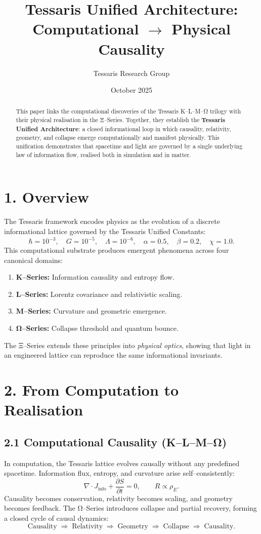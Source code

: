 \documentclass[11pt,a4paper]{article}
\title{\textbf{Tessaris Unified Architecture:\\Computational $\rightarrow$ Physical Causality}}
\author{Tessaris Research Group}
\date{October 2025}
\begin{document}
\maketitle

\begin{abstract}
This paper links the computational discoveries of the Tessaris K--L--M--Ω trilogy with their physical realisation in the Ξ--Series.  
Together, they establish the \textbf{Tessaris Unified Architecture}: a closed informational loop in which causality, relativity, geometry, and collapse emerge computationally and manifest physically.  
This unification demonstrates that spacetime and light are governed by a single underlying law of information flow, realised both in simulation and in matter.
\end{abstract}

\section{1. Overview}
The Tessaris framework encodes physics as the evolution of a discrete informational lattice governed by the Tessaris Unified Constants:
\[
\hbar = 10^{-3}, \quad G = 10^{-5}, \quad \Lambda = 10^{-6}, \quad \alpha = 0.5, \quad \beta = 0.2, \quad \chi = 1.0.
\]
This computational substrate produces emergent phenomena across four canonical domains:
\begin{enumerate}
  \item \textbf{K--Series:} Information causality and entropy flow.
  \item \textbf{L--Series:} Lorentz covariance and relativistic scaling.
  \item \textbf{M--Series:} Curvature and geometric emergence.
  \item \textbf{Ω--Series:} Collapse threshold and quantum bounce.
\end{enumerate}
The Ξ--Series extends these principles into \emph{physical optics}, showing that light in an engineered lattice can reproduce the same informational invariants.

\section{2. From Computation to Realisation}
\subsection*{2.1 Computational Causality (K--L--M--Ω)}
In computation, the Tessaris lattice evolves causally without any predefined spacetime.  
Information flux, entropy, and curvature arise self--consistently:
\[
\nabla \!\cdot\! J_{\mathrm{info}} + \frac{\partial S}{\partial t} = 0, \qquad R \propto \rho_E.
\]
Causality becomes conservation, relativity becomes scaling, and geometry becomes feedback.  
The Ω--Series introduces collapse and partial recovery, forming a closed cycle of causal dynamics:
\[
\text{Causality} \;\Rightarrow\; \text{Relativity} \;\Rightarrow\; \text{Geometry} \;\Rightarrow\; \text{Collapse} \;\Rightarrow\; \text{Causality}.
\]
\end{document}
